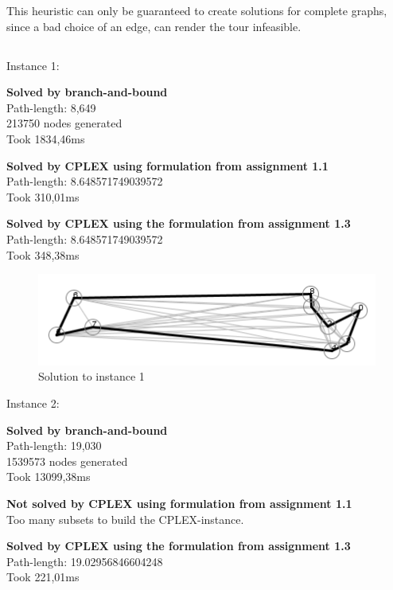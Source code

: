 This heuristic can only be guaranteed to create solutions for complete graphs, since a bad choice of an edge, can render the tour infeasible.

\subsection{}
Instance 1:

\newpar \textbf{Solved by branch-and-bound}\\
Path-length: 8,649\\
213750 nodes generated\\
Took 1834,46ms

\newpar \textbf{Solved by CPLEX using formulation from assignment 1.1}\\
Path-length: 8.648571749039572\\
Took 310,01ms

\newpar \textbf{Solved by CPLEX using the formulation from assignment 1.3}\\
Path-length: 8.648571749039572\\
Took 348,38ms

\begin{figure}[H]
	\includegraphics[width=.9\textwidth]{figures/Instance1Solution.png}
	\caption{Solution to instance 1}
	\label{solution:1}
\end{figure}

\noindent Instance 2:

\newpar \textbf{Solved by branch-and-bound}\\
Path-length: 19,030\\
1539573 nodes generated\\
Took 13099,38ms

\newpar \textbf{Not solved by CPLEX using formulation from assignment 1.1}\\
Too many subsets to build the CPLEX-instance.

\newpar \textbf{Solved by CPLEX using the formulation from assignment 1.3}\\
Path-length: 19.02956846604248\\
Took 221,01ms

